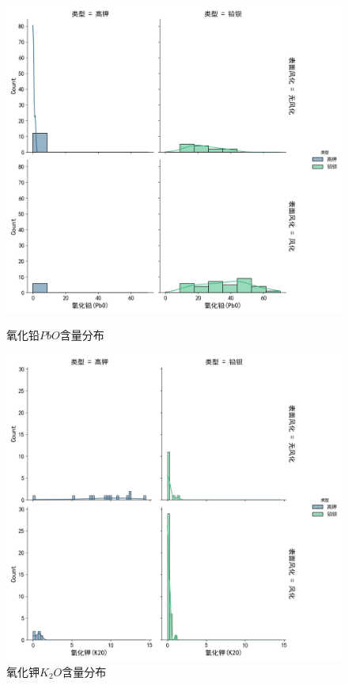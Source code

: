 \begin{figure}[H]
	\centering
	\begin{minipage}{0.48\textwidth}
		\centering
		\includegraphics[width=\linewidth]{figs/3问题一/分布图_氧化铅(PbO).png}
		\caption{氧化铅$PbO$含量分布}
		\label{fig:pbo_dist}
	\end{minipage}\hfill
	\begin{minipage}{0.48\textwidth}
		\centering
		\includegraphics[width=\linewidth]{figs/3问题一/分布图_氧化钾(K2O).png}
		\caption{氧化钾$K_2O$含量分布}
		\label{fig:k2o_dist}
	\end{minipage}
\end{figure}

